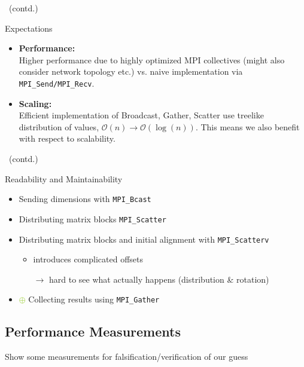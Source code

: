 \documentclass[9pt,pdftex,xcolor=dvipsnames]{beamer}
\begin{document}
\begin{frame}{\insertsubsection \ (contd.)}
\begin{block}{Expectations}
\begin{itemize}
\item \textbf{Performance:\\}
Higher performance due to highly optimized MPI collectives (might also consider network topology etc.) vs. naive implementation via \lstinline[basicstyle=\ttfamily]{MPI_Send/MPI_Recv}.

\item \textbf{Scaling:\\}
Efficient implementation of Broadcast, Gather, Scatter use treelike distribution of values, $\mathcal{O}\left(n\right) \rightarrow \mathcal{O}\left(\log(n)\right)$. This means we also benefit with respect to scalability.
\end{itemize}
\end{block}
\end{frame}


\begin{frame}{\insertsubsection \ (contd.)}
\begin{block}{Readability and Maintainability}
\begin{itemize}
\item[\textcolor{YellowGreen}{$\bm\oplus$}] Sending dimensions with \lstinline[basicstyle=\ttfamily]{MPI_Bcast}
\item[\textcolor{YellowGreen}{$\bm\oplus$}] Distributing matrix blocks \lstinline[basicstyle=\ttfamily]{MPI_Scatter}
\item[\textcolor{red}{$\bm\ominus$}]
Distributing matrix blocks and initial alignment with \lstinline[basicstyle=\ttfamily]{MPI_Scatterv} 
	\begin{itemize}
	\item[$\rightarrow$] introduces complicated offsets 
	\item[$\rightarrow$] hard to see what actually happens (distribution \& rotation)
	\end{itemize} 
\item[\textcolor{YellowGreen}{$\bm{\oplus}$}] Collecting results using \lstinline[basicstyle=\ttfamily]{MPI_Gather}
\end{itemize}
\end{block}
\end{frame}



\subsection{Performance Measurements}
\begin{frame}{\insertsubsection}
Show some measurements for falsification/verification of our guess
\end{frame}
\end{document}
